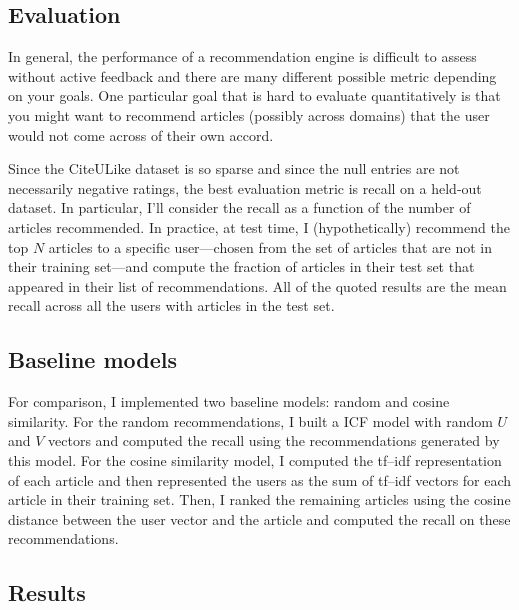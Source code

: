 \documentclass[11pt]{article}
\begin{document}
\subsection{Evaluation}

In general, the performance of a recommendation engine is difficult to assess
without active feedback and there are many different possible metric depending
on your goals.
One particular goal that is hard to evaluate quantitatively is that you might
want to recommend articles (possibly across domains) that the user would not
come across of their own accord.

Since the CiteULike dataset is so sparse and since the null entries are not
necessarily negative ratings, the best evaluation metric is recall on a
held-out dataset.
In particular, I'll consider the recall as a function of the number of
articles recommended.
In practice, at test time, I (hypothetically) recommend the top $N$ articles
to a specific user---chosen from the set of articles that are not in their
training set---and compute the fraction of articles in their test set that
appeared in their list of recommendations.
All of the quoted results are the mean recall across all the users with
articles in the test set.

\subsection{Baseline models}

For comparison, I implemented two baseline models: random and cosine
similarity.
For the random recommendations, I built a ICF model with random $U$ and $V$
vectors and computed the recall using the recommendations generated by this
model.
For the cosine similarity model, I computed the tf--idf representation of each
article and then represented the users as the sum of tf--idf vectors for each
article in their training set.
Then, I ranked the remaining articles using the cosine distance between the
user vector and the article and computed the recall on these recommendations.

\subsection{Results}
\end{document}
